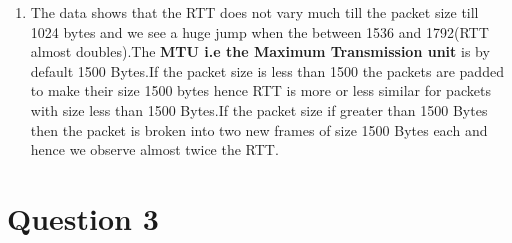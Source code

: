 \documentclass[a4paper,11pt]{article}
\begin{document}
\begin{enumerate}[itemsep=-3pt,label=(\alph*)]
\begin{table}[h]
    \end{table}
    \FloatBarrier
    \vspace{15mm}
    \item The data shows that the RTT does not vary much till the packet
    size till 1024 bytes and we see a huge jump when the between 1536 and 1792(RTT almost doubles).The \textbf{MTU i.e the Maximum Transmission unit} is by default 1500 Bytes.If the packet size is less than 1500 the packets are padded to make their size 1500 bytes hence RTT is more or less similar for packets with size less than 1500 Bytes.If the packet size if greater than 1500 Bytes then the packet is broken into two new frames of size 1500 Bytes each and hence we observe almost twice the RTT.
\end{enumerate}
\pagebreak
\section*{Question 3}
\end{document}
